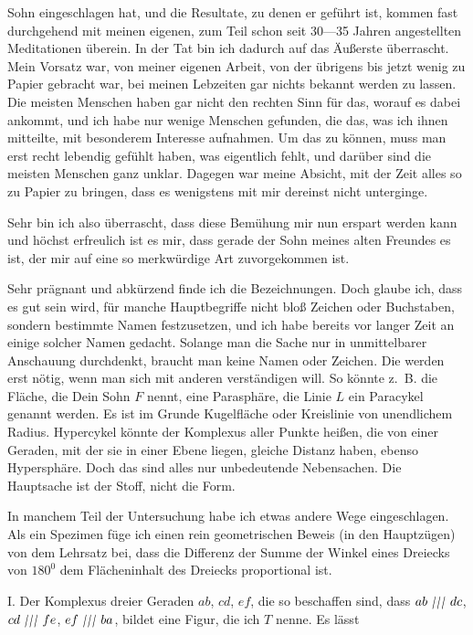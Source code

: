 %
Sohn eingeschlagen hat, und die Resultate, zu denen er geführt ist, kommen fast durchgehend mit meinen eigenen, zum Teil schon seit 30—35 Jahren angestellten Meditationen überein. In der Tat bin ich dadurch auf das Äußerste überrascht. Mein Vorsatz war, von meiner eigenen Arbeit, von der übrigens bis jetzt wenig zu Papier gebracht war, bei meinen Lebzeiten gar nichts bekannt werden zu lassen. Die meisten Menschen haben gar nicht den rechten Sinn für das, worauf es dabei ankommt, und ich habe nur wenige Menschen gefunden, die das, was ich ihnen mitteilte, mit besonderem Interesse aufnahmen. Um das zu können, muss man erst recht lebendig gefühlt haben, was eigentlich fehlt, und darüber sind die meisten Menschen ganz unklar. Dagegen war meine Absicht, mit der Zeit alles so zu Papier zu bringen, dass es wenigstens mit mir dereinst nicht unterginge.

Sehr bin ich also überrascht, dass diese Bemühung mir nun erspart werden kann und höchst erfreulich ist es mir, dass gerade der Sohn meines alten Freundes es ist, der mir auf eine so merkwürdige Art zuvorgekommen ist.

Sehr prägnant und abkürzend finde ich die Bezeichnungen. Doch glaube ich, dass es gut sein wird, für manche Hauptbegriffe nicht bloß Zeichen oder Buchstaben, sondern bestimmte Namen festzusetzen, und ich habe bereits vor langer Zeit an einige solcher Namen gedacht. Solange man die Sache nur in unmittelbarer Anschauung durchdenkt, braucht man keine Namen oder Zeichen. Die werden erst nötig, wenn man sich mit anderen verständigen will. So könnte z.~B. die Fläche, die Dein Sohn $F$ nennt, eine Parasphäre, die Linie $L$ ein Paracykel genannt werden. Es ist im Grunde Kugelfläche oder Kreislinie von unendlichem Radius. Hypercykel könnte der Komplexus aller Punkte heißen, die von einer Geraden, mit der sie in einer Ebene liegen, gleiche Distanz haben, ebenso Hypersphäre. Doch das sind alles nur unbedeutende Nebensachen. Die Hauptsache ist der Stoff, nicht die Form.

In manchem Teil der Untersuchung habe ich etwas andere Wege eingeschlagen. Als ein Spezimen füge ich einen rein geometrischen Beweis (in den Hauptzügen) von dem Lehrsatz bei, dass die Differenz der Summe der Winkel eines Dreiecks von $180^{0}$ dem Flächeninhalt des Dreiecks proportional ist.

I. Der Komplexus dreier Geraden $ab$, $cd$, $ef$, die so beschaffen sind, dass $ab\TripleParallel dc$, $cd\TripleParallel fe$, $ef\TripleParallel ba$, bildet eine Figur, die ich $T$ nenne. Es lässt
